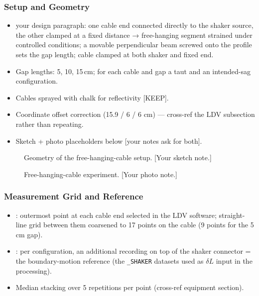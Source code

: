 \subsubsection{Setup and Geometry}
\begin{itemize}
  \item [KEEP] your design paragraph: one cable end connected directly to
    the shaker source, the other clamped at a fixed distance → free-hanging
    segment strained under controlled conditions; a movable perpendicular
    beam screwed onto the profile sets the gap length; cable clamped at
    both shaker and fixed end.
  \item Gap lengths: 5, 10, 15\,cm; for each cable and gap a taut and an
    intended-sag configuration.
  \item Cables sprayed with chalk for reflectivity [KEEP].
  \item Coordinate offset correction (15.9 / 6 / 6 cm) — cross-ref the LDV
    subsection rather than repeating.
  \item Sketch + photo placeholders below [your notes ask for both].
\end{itemize}

\begin{figure}[htb]
  \centering
  \caption{Geometry of the free-hanging-cable setup. [Your sketch note.]}
  \label{fig:methods:maingeom}
\end{figure}

\begin{figure}[htb]
  \centering
  \caption{Free-hanging-cable experiment. [Your photo note.]}
  \label{fig:methods:mainphoto}
\end{figure}

\subsubsection{Measurement Grid and Reference}
\begin{itemize}
  \item [KEEP]: outermost point at each cable end selected in the LDV
    software; straight-line grid between them coarsened to 17 points on the
    cable (9 points for the 5\,cm gap).
  \item [KEEP]: per configuration, an additional recording on top of the
    shaker connector = the boundary-motion reference (the
    \texttt{\_SHAKER} datasets used as $\delta L$ input in the processing).
  \item Median stacking over 5 repetitions per point (cross-ref equipment
    section).
\end{itemize}

